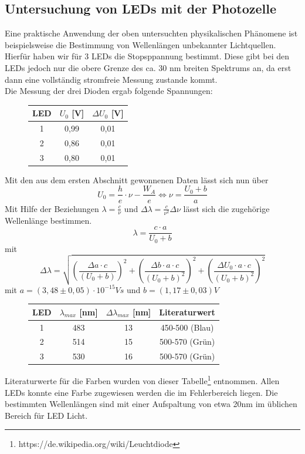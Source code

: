 \documentclass{scrartcl}
\begin{document}
	\subsection{Untersuchung von LEDs mit der Photozelle}
		Eine praktische Anwendung der oben untersuchten physikalischen Phänomene ist beispielsweise
		die Bestimmung von Wellenlängen unbekannter Lichtquellen. Hierfür haben wir für 3 LEDs die 
		Stopsppannung bestimmt. Diese gibt bei den LEDs jedoch nur die obere Grenze des ca. 30 nm breiten Spektrums an,
		da erst dann eine vollständig stromfreie Messung zustande kommt.\\
		Die Messung der drei Dioden ergab folgende Spannungen:
		\begin{figure}[H]
			\centering
			\begin{tabular}{|c|c|c|}
				\hline
				LED & $U_0$ [V] & $\Delta U_0$ [V] \\
				\hline
				1 & 0,99 & 0,01\\
				2 & 0,86 & 0,01\\
				3 & 0,80 & 0,01\\
				\hline
			\end{tabular}
		\end{figure}
		Mit den aus dem ersten Abschnitt gewonnenen Daten lässt sich nun über
		\begin{equation}
			U_0 = \frac{h}{e}\cdot \nu - \frac{W_A}{e}
			\Leftrightarrow 
			\nu = \frac{U_0 + b}{a}
		\end{equation}
		Mit Hilfe der Beziehungen $ \lambda = \frac{c}{\nu}$ und $\Delta \lambda = \frac{c}{\nu^2} \Delta \nu$
		lässt sich die zugehörige Wellenlänge bestimmen.
		\begin{equation}
			\lambda = \frac{c\cdot a }{U_0 + b}
		\end{equation}
		mit
		\begin{equation}
			\Delta \lambda = \sqrt{(\frac{\Delta a \cdot c}{(U_0+b)})^2+(\frac{\Delta b \cdot a \cdot c}{(U_0+b)^2})^2+(\frac{\Delta U_0 \cdot a \cdot c}{(U_0+b)^2})^2}
		\end{equation}
		mit $a = (3,48 \pm 0,05) \cdot 10^{-15} Vs$ und $b=(1,17 \pm 0,03)V$
		\begin{figure}[H]
			\centering
			\begin{tabular}{|c|c|c|c|}
				\hline
				LED & $\lambda_{max}$ [nm] & $\Delta\lambda_{max}$ [nm] & Literaturwert \\
				\hline
				1 & 483 & 13 & 450-500 (Blau)\\
				2 & 514 & 15 & 500-570 (Grün)\\
				3 & 530 & 16 & 500-570 (Grün)\\
				\hline
			\end{tabular}
		\end{figure}
		Literaturwerte für die Farben wurden von dieser Tabelle\footnote{https://de.wikipedia.org/wiki/Leuchtdiode} entnommen.
		Allen LEDs konnte eine Farbe zugewiesen werden die im Fehlerbereich liegen. Die bestimmten Wellenlängen sind mit einer 
		Aufspaltung von etwa 20nm im üblichen Bereich für LED Licht.  
\end{document}

